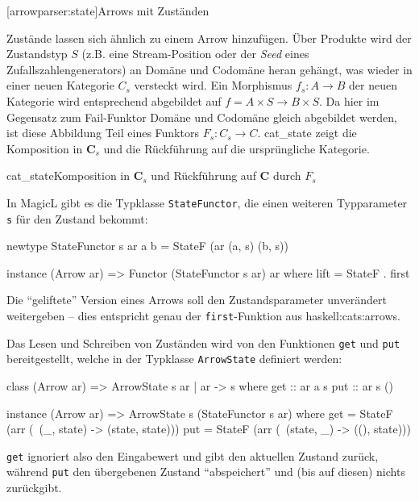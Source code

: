 \documentclass[11pt, a4paper, bibgerm]{scrbook}
\newenvironment{DIFnomarkup}{}{}
\newcommand\icode[1]{\lstinline?#1?}
\newcommand\lsection{}
\newcommand\sref{}
\newcommand\abb{}
\newcommand\fig{}
\newcommand\ato{\rightarrow} %
\begin{document}
\lsection[arrowparser:state]{Arrows mit Zuständen}

Zustände lassen sich ähnlich zu einem Arrow hinzufügen. Über Produkte
wird der Zustandstyp $S$ (z.B. eine Stream-Position oder der
\textit{Seed} eines Zufallszahlengenerators) an Domäne und Codomäne
heran gehängt, was wieder in einer neuen Kategorie $C_{s}$ versteckt
wird. Ein Morphismus $f_{s} : A \rightarrow B$ der neuen Kategorie
wird entsprechend abgebildet auf $f = A \times S \rightarrow B \times
S$. Da hier im Gegensatz zum Fail-Funktor Domäne und Codomäne gleich
abgebildet werden, ist diese Abbildung Teil eines Funktors $F_s: C_{s}
\ato C$. \abb{cat_state} zeigt die Komposition in $\mathbf{C}_s$ und die
Rückführung auf die ursprüngliche Kategorie.

\fig{cat_state}{Komposition in $\mathbf{C}_s$ und Rückführung auf
  $\mathbf{C}$ durch $F_s$}

In MagicL gibt es die Typklasse \icode{StateFunctor}, die einen weiteren
Typparameter \icode{s} für den Zustand bekommt:

\begin{DIFnomarkup}\begin{code}
newtype StateFunctor s ar a b = StateF (ar (a, s) (b, s))

instance (Arrow ar) => Functor (StateFunctor s ar) ar where
    lift = StateF . first
\end{code}\end{DIFnomarkup} %

Die "`geliftete"' Version eines Arrows soll den Zustandsparameter
unverändert weitergeben -- dies entspricht genau der
\icode{first}-Funktion aus \sref{haskell:cats:arrows}.

Das Lesen und Schreiben von Zuständen wird von den Funktionen \icode{get} und
\icode{put} bereitgestellt, welche in der Typklasse \icode{ArrowState}
definiert werden:

\begin{DIFnomarkup}\begin{code}
class (Arrow ar) => ArrowState s ar | ar -> s where
  get :: ar a s
  put :: ar s ()

instance (Arrow ar) => ArrowState s (StateFunctor s ar)
  where
    get = StateF (arr (\ (_, state) -> (state, state)))
    put = StateF (arr (\ (state, _) -> ((), state)))
\end{code}\end{DIFnomarkup}

\icode{get} ignoriert also den Eingabewert und gibt den aktuellen
Zustand zurück, während \icode{put} den übergebenen Zustand
"`abspeichert"' und (bis auf diesen) nichts zurückgibt.
\end{document}
